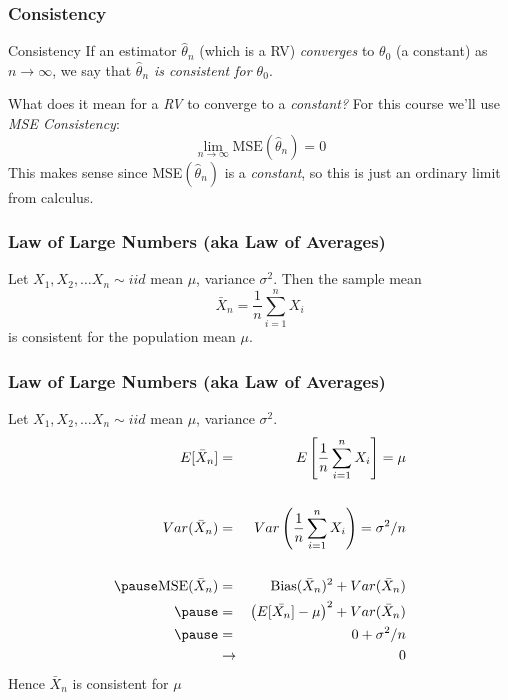 \documentclass[handout]{beamer}
\begin{document}
\begin{frame}
\frametitle{Consistency}

\begin{block}{Consistency}
If an estimator $\widehat{\theta}_n$ (which is a RV) \emph{converges} to $\theta_0$ (a constant) as $n\rightarrow \infty$, we say that \emph{\alert{$\widehat{\theta}_n$ is consistent for $\theta_0$}}.
\end{block}
\vspace{2em}

\begin{alertblock}{What does it mean for a \emph{RV} to converge to a \emph{constant?}}
For this course we'll use \emph{MSE Consistency}:
	$$\lim_{n \rightarrow \infty}\mbox{MSE}(\widehat{\theta}_n) = 0$$
This makes sense since MSE$(\widehat{\theta}_n)$ is a \emph{constant}, so this is just an ordinary limit from calculus.
\end{alertblock}

\end{frame}

\begin{frame}
\frametitle{Law of Large Numbers (aka Law of Averages)}
Let $X_1, X_2, \hdots X_n \sim iid$ mean $\mu$, variance $\sigma^2$. Then the sample mean 
	$$\bar{X}_n = \frac{1}{n}\sum_{i=1}^n X_i$$
is consistent for the population mean $\mu$.
\end{frame}




\begin{frame}
\frametitle{Law of Large Numbers (aka Law of Averages)}
Let $X_1, X_2, \hdots X_n \sim iid$ mean $\mu$, variance $\sigma^2$. 
	\begin{eqnarray*}
			E[\bar{X}_n] &=&  E \left[\frac{1}{n}\sum_{i=1}^n X_i\right] = \mu\\\\ 
      Var(\bar{X}_n) &=& Var\left(\frac{1}{n}\sum_{i=1}^n X_i  \right) = \sigma^2/n\\\\ \pause
			\mbox{MSE}(\bar{X}_n) &=& \mbox{Bias}(\bar{X}_n)^2 + Var(\bar{X}_n)\\\pause
				&=& \left(E[\bar{X_n}] - \mu\right)^2 + Var(\bar{X}_n)\\ \pause
				&=& 0 + \sigma^2/n\\ 
				&\rightarrow& 0
	\end{eqnarray*}
	\alert{Hence $\bar{X}_n$ is consistent for $\mu$}
\end{frame}
\end{document}
